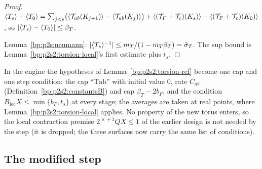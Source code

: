 \begin{proof}
\label{step:p2s2:tr-t}
$\langle T_s\rangle-\langle T_0\rangle=\sum_{j<s}\bigl(\langle \mathcal T_{ab}(K_{j+1})\rangle-\langle \mathcal T_{ab}(K_j)\rangle\bigr)+\langle (\mathcal T_F+\mathcal T_c)(K_s)\rangle-\langle (\mathcal T_F+\mathcal T_c)(K_0)\rangle$,
so $\lvert \langle T_s\rangle-\langle T_0\rangle\rvert\le\beta_T$.

\label{step:p2s2:tr-n}
Lemma~\ref{bp:p2s:neumann}: $\lvert \langle T_s\rangle^{-1}\rvert\le m_T/(1-m_T\beta_T)=\hat\sigma_T$. The sup bound is Lemma~\ref{bp:p2s2:torsion-local}'s first estimate plus
$t_s$.
\end{proof}

In the engine the hypotheses of Lemma~\ref{bp:p2s2:torsion-ref} become one cap and one step condition: the cap ``$\mathrm{Tab}$'' with initial
value $0$, rate $C_{ab}$ (Definition~\ref{bp:p2s2:constantsB}) and cap $\beta_T-2b_F$, and the condition $B_{\mathrm{loc}}X\le\min\{b_F,t_s\}$ at
every stage; the averages are taken at real points, where Lemma~\ref{bp:p2s2:torsion-local} applies. No property of the new torus enters,
so the local contraction premise $2^{\varkappa+1}QX\le1$ of the earlier design is not needed by the step (it is dropped; the three
surfaces now carry the same list of conditions).

\subsection{The modified step}\label{bp:p2s2:sec-step}


